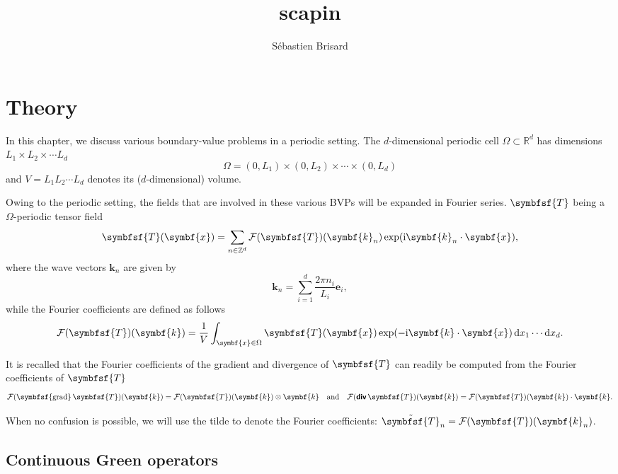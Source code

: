 \documentclass[draft, appendixprefix=true, chapterprefix=true, fontsize=12pt, numbers=noendperiod]{scrbook}
\title{scapin}
\author{Sébastien Brisard}
\newcommand{\D}{{\mathrm d}}
\newcommand{\I}{\mathrm{i}}
\newcommand{\integers}{\mathbb{Z}}
\newcommand{\reals}{\mathbb{R}}
\DeclareMathOperator{\tdiv}{\textbf{\textsf{div}}}
\DeclareMathOperator{\tgrad}{\symbfsf{grad}}
\newcommand{\tens}[1]{\symbfsf{#1}}
\renewcommand{\vec}[1]{\symbf{#1}}
\begin{document}
\maketitle

\chapter{Theory}

In this chapter, we discuss various boundary-value problems in a periodic
setting. The \(d\)-dimensional periodic cell \(\Omega\subset\reals^d\) has
dimensions \(L_1\times L_2\times\cdots L_d\)
\begin{equation}
  \label{eq:1}
  \Omega=(0, L_1)\times(0, L_2)\times\cdots\times(0, L_d)
\end{equation}
and \(V=L_1L_2\cdots L_d\) denotes its (\(d\)-dimensional) volume.

Owing to the periodic setting, the fields that are involved in these various
BVPs will be expanded in Fourier series. \(\tens T\) being a
\(\Omega\)-periodic tensor field
\begin{equation}
  \label{eq:2}
  \tens T(\vec x)=\sum_{n\in\integers^d}\mathcal F(\tens T)(\vec k_n)\exp(\I
  \vec k_n\cdot\vec x),
\end{equation}
where the wave vectors \(\vec k_n\) are given by
\begin{equation}
  \label{eq:3}
  \vec k_n=\sum_{i=1}^d\frac{2\pi n_i}{L_i}\vec e_i,
\end{equation}
while the Fourier coefficients are defined as follows
\begin{equation}
  \label{eq:5}
  \mathcal F(\tens T)(\vec k)=\frac1V\int_{\vec x\in\Omega}\tens T(\vec x)
  \exp(-\I\vec k\cdot\vec x)\,\D x_1\cdots\D x_d.
\end{equation}

It is recalled that the Fourier coefficients of the gradient and divergence of
\(\tens T\) can readily be computed from the Fourier coefficients of
\(\tens T\)
\begin{equation}
  \label{eq:4}
  \mathcal F(\tgrad\tens T)(\vec k)=\mathcal F(\tens T)(\vec k)\otimes\vec k
  \quad\text{and}\quad
  \mathcal F(\tdiv\tens T)(\vec k)=\mathcal F(\tens T)(\vec k)\cdot\vec k.
\end{equation}

When no confusion is possible, we will use the tilde to denote the Fourier
coefficients: \(\tilde{\tens T}_n=\mathcal F(\tens T)(\vec k_n)\).

\section{Continuous Green operators}
\end{document}
